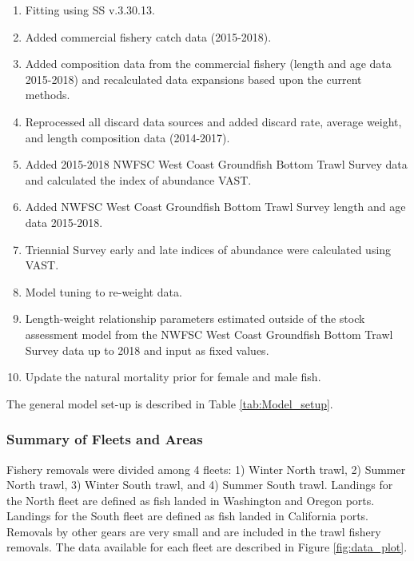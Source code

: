 \documentclass[12pt,]{article}
\begin{document}
\begin{enumerate}

\item Fitting using SS v.3.30.13.

\item Added commercial fishery catch data (2015-2018).

\item Added composition data from the commercial fishery (length and age data 2015-2018) and recalculated data expansions based upon the current methods.

\item Reprocessed all discard data sources and added discard rate, average weight, and length composition data (2014-2017).

\item Added 2015-2018 NWFSC West Coast Groundfish Bottom Trawl Survey  data and calculated the index of abundance VAST.

\item Added NWFSC West Coast Groundfish Bottom Trawl Survey length and age data 2015-2018.

\item Triennial Survey early and late indices of abundance were calculated using VAST.

\item Model tuning to re-weight data. 

\item Length-weight relationship parameters estimated outside of the stock assessment model from the NWFSC West Coast Groundfish Bottom Trawl Survey data up to 2018 and input as fixed values.

\item Update the natural mortality prior for female and male fish.

\end{enumerate}

The general model set-up is described in Table \ref{tab:Model_setup}.

\subsubsection{Summary of Fleets and
Areas}\label{summary-of-fleets-and-areas}

Fishery removals were divided among 4 fleets: 1) Winter North trawl, 2)
Summer North trawl, 3) Winter South trawl, and 4) Summer South trawl.
Landings for the North fleet are defined as fish landed in Washington
and Oregon ports. Landings for the South fleet are defined as fish
landed in California ports. Removals by other gears are very small and
are included in the trawl fishery removals. The data available for each
fleet are described in Figure \ref{fig:data_plot}.
\end{document}
